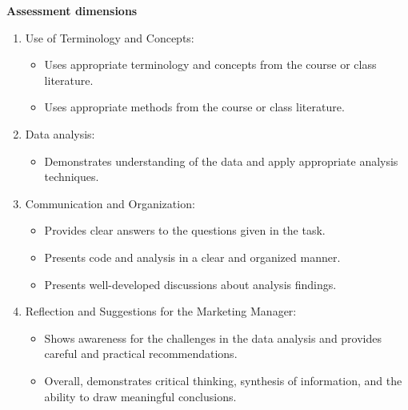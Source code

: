 \documentclass[10pt]{article}
\begin{document}
\textbf{Assessment dimensions}
\begin{enumerate}
    \item Use of Terminology and Concepts:
    \begin{itemize}
        \item Uses appropriate terminology and concepts from the course or class literature.
        \item Uses appropriate methods from the course or class literature.
    \end{itemize}
    \item Data analysis: 
    \begin{itemize}
        \item Demonstrates understanding of the data and apply appropriate analysis techniques.
    \end{itemize}
    \item Communication and Organization: 
    \begin{itemize}
        \item Provides clear answers to the questions given in the task.
        \item Presents code and analysis in a clear and organized manner.
        \item Presents well-developed discussions about analysis findings.
    \end{itemize}
    \item Reflection and Suggestions for the Marketing Manager:
    \begin{itemize}
        \item Shows awareness for the challenges in the data analysis and provides careful and
        practical recommendations.
        \item Overall, demonstrates critical thinking, synthesis of information, and the ability to draw
        meaningful conclusions.
    \end{itemize}
\end{enumerate}
\end{document}
